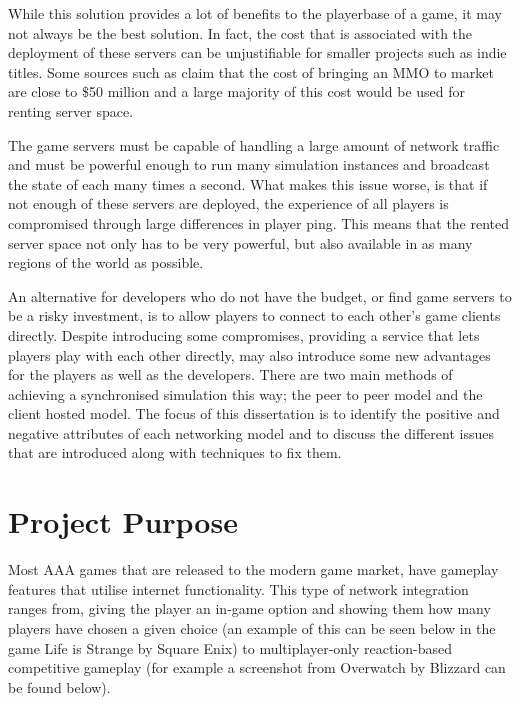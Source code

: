 While this solution provides a lot of benefits to the playerbase of a game, it may not always be the best solution. In fact, the cost that is associated with the deployment of these servers can be unjustifiable for smaller projects such as indie titles. Some sources such as  claim that the cost of bringing an MMO to market are close to \$50 million and a large majority of this cost would be used for renting server space.

The game servers must be capable of handling a large amount of network traffic and must be powerful enough to run many simulation instances and broadcast the state of each many times a second. What makes this issue worse, is that if not enough of these servers are deployed, the experience of all players is compromised through large differences in player ping. This means that the rented server space not only has to be very powerful, but also available in as many regions of the world as possible.

An alternative for developers who do not have the budget, or find game servers to be a risky investment, is to allow players to connect to each other's game clients directly. Despite introducing some compromises, providing a service that lets players play with each other directly, may also introduce some new advantages for the players as well as the developers. There are two main methods of achieving a synchronised simulation this way; the peer to peer model and the client hosted model. The focus of this dissertation is to identify the positive and negative attributes of each networking model and to discuss the different issues that are introduced along with techniques to fix them.


\section{Project Purpose}
Most AAA games that are released to the modern game market, have gameplay features that utilise internet functionality. This type of network integration ranges from, giving the player an in-game option and showing them how many players have chosen a given choice (an example of this can be seen below in the game Life is Strange by Square Enix) to multiplayer-only reaction-based competitive gameplay (for example a screenshot from Overwatch by Blizzard can be found below).

\begin{figure}[!h]
  \centering
{}
  \qquad
\end{figure}

